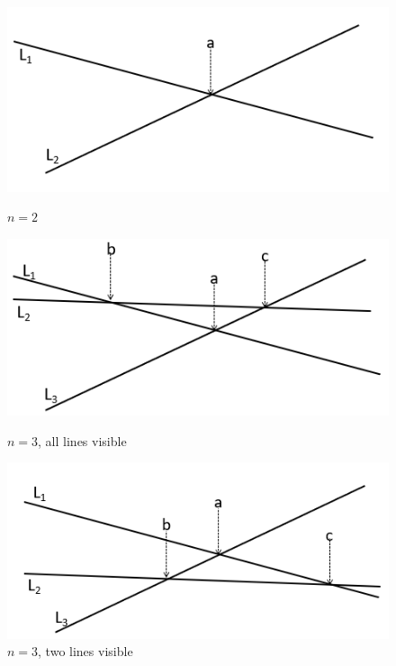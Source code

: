 \documentclass{article}
\begin{document}
\begin{figure}[!h]
  \centering
  \begin{minipage}[b]{0.3\textwidth}
    \includegraphics[width=1.0\textwidth]{Images/Prob1a.png}
    \caption{$n=2$}
  \end{minipage}
  \hfill
  \begin{minipage}[b]{0.3\textwidth}
    \includegraphics[width=1.0\textwidth]{Images/Prob1b.png}
    \caption{$n=3$, all lines visible}
  \end{minipage}
  \hfill
  \begin{minipage}[b]{0.3\textwidth}
    \includegraphics[width=1.0\textwidth]{Images/Prob1c.png}
    \caption{$n=3$, two lines visible}
  \end{minipage}
\end{figure}
\end{document}
